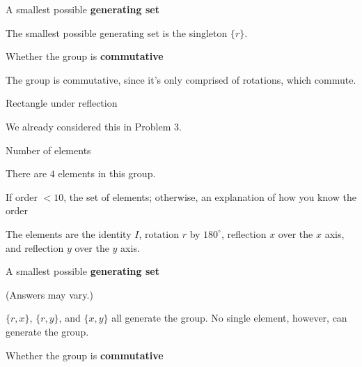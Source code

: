 \documentclass[../gatm_answers.tex]{subfiles}
\begin{document}
\begin{inner_problem}
\item A smallest possible \textbf{generating set}
\end{inner_problem}

\noindent The smallest possible generating set is the singleton $\{r\}$.

\begin{inner_problem}
\item Whether the group is \textbf{commutative}
\end{inner_problem}

\noindent The group is commutative, since it's only comprised of rotations, which commute.

\begin{outer_problem}
\item Rectangle under reflection
\end{outer_problem}

\noindent We already considered this in Problem 3.

\begin{inner_problem}[start=1]
\item Number of elements
\end{inner_problem}

\noindent There are $4$ elements in this group.

\begin{inner_problem}
\item If order $< 10$, the set of elements; otherwise, an explanation of how you know the order
\end{inner_problem}

\noindent The elements are the identity $I$, rotation $r$ by $180^\circ$, reflection $x$ over the $x$ axis, and reflection $y$ over the $y$ axis.

\begin{inner_problem}
\item A smallest possible \textbf{generating set}
\end{inner_problem}

\noindent (Answers may vary.)

$\{r,x\}$, $\{r,y\}$, and $\{x,y\}$ all generate the group. No single element, however, can generate the group.

\begin{inner_problem}
\item Whether the group is \textbf{commutative}
\end{inner_problem}
\end{document}
